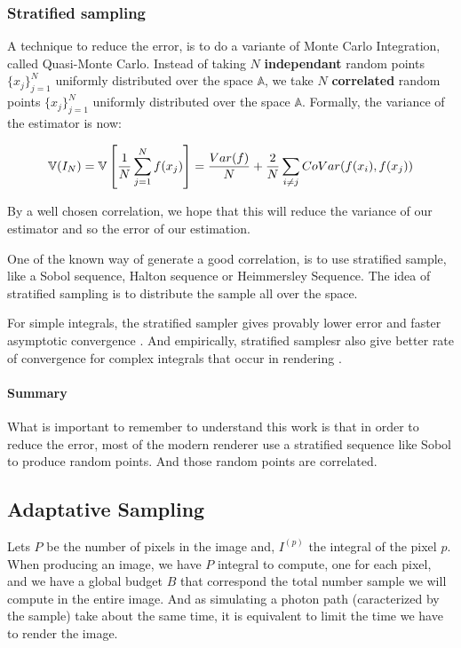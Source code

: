 \documentclass{classeENS}
\begin{document}
\subsubsection{Stratified sampling}

A technique to reduce the error, is to do a variante of Monte Carlo Integration, 
called Quasi-Monte Carlo. Instead of taking $N$ \textbf{independant} random points $\{x_j\}_{j=1}^N$ 
uniformly distributed over the space $\mathbb A$, we take $N$ \textbf{correlated} random 
points $\{x_j\}_{j=1}^N$ uniformly distributed over the space $\mathbb A$. Formally, 
the variance of the estimator is now:
 
\[ \mathbb V(I_N) = \mathbb V\left [\frac{1}{N}\sum_{j=1}^N f(x_j) \right ] = \frac{Var(f)}{N} + \frac{2}{N}\sum_{i\neq j} CoVar(f(x_i),f(x_j)) \]

By a well chosen correlation, we hope that this will reduce the variance of our estimator and so the error
of our estimation. 

\par One of the known way of generate a good correlation, is to use stratified sample, like 
a Sobol sequence, Halton sequence or Heimmersley Sequence. The idea
of stratified sampling is to distribute the sample all over the space.

For simple integrals, the stratified sampler gives provably lower error and 
faster asymptotic convergence \cite{10.1145/237170.237265}. And empirically,
stratified samplesr also give better rate of convergence for complex integrals that
occur in rendering \cite{renderman}.

\paragraph*{Summary} What is important to remember to understand this work is that 
in order to reduce the error, most of the modern renderer use a stratified sequence like 
Sobol \cite{renderman} to produce random points. And those random points are correlated.

\subsection{Adaptative Sampling}

\par Lets $P$ be the number of pixels in the image and, $I^{(p)}$ the integral of the pixel $p$. 
When producing an image, we have $P$ integral to compute, one for each pixel, and we have a
global budget $B$ that correspond the total number sample we will compute in the entire 
image. And as simulating a photon path (caracterized by the sample) take about the 
same time, it is equivalent to limit the time we have to render the image.
\end{document}
